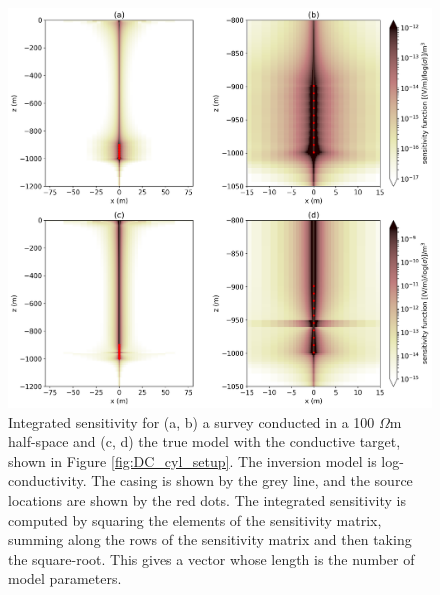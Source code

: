 \begin{figure}
    \begin{center}
    \includegraphics[width=\textwidth]{figures/inversion/casing_sensitivity.png}
    \end{center}
\caption{
    Integrated sensitivity for (a, b) a survey conducted in a 100 $\Omega$m half-space and
    (c, d) the true model with the conductive target, shown in Figure \ref{fig:DC_cyl_setup}.
    The inversion model is log-conductivity.
    The casing is
    shown by the grey line, and the source locations are shown by the red dots. The integrated sensitivity
    is computed by squaring the elements of the sensitivity matrix, summing along the rows of the sensitivity
    matrix and then taking the square-root. This gives a vector whose length is the number of model parameters.
}
\label{fig:casing_sensitivity}
\end{figure}
